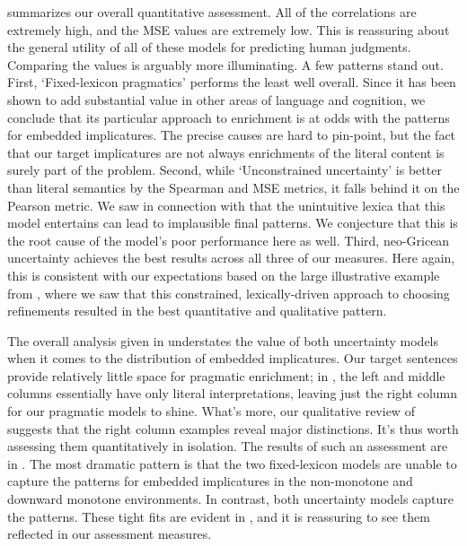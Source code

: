 \documentclass[leqno,12pt]{article}
\begin{document}
 summarizes our overall quantitative
assessment. All of the correlations are extremely high, and the MSE
values are extremely low. This is reassuring about the general utility
of all of these models for predicting human judgments. Comparing the
values is arguably more illuminating. A few patterns stand out.
First, `Fixed-lexicon pragmatics' performs the least well overall.
Since it has been shown to add substantial value in other areas of
language and cognition, we conclude that its particular approach to
enrichment is at odds with the patterns for embedded implicatures.
The precise causes are hard to pin-point, but the fact that our target
implicatures are not always enrichments of the literal content is
surely part of the problem.  Second, while `Unconstrained uncertainty'
is better than literal semantics by the Spearman and MSE metrics, it
falls behind it on the Pearson metric. We saw in connection with
 that the unintuitive lexica that this model
entertains can lead to implausible final patterns. We conjecture that
this is the root cause of the model's poor performance here as well.
Third, neo-Gricean uncertainty achieves the best results across all
three of our measures. Here again, this is consistent with our
expectations based on the large illustrative example from
, where we saw that this constrained,
lexically-driven approach to choosing refinements resulted in the best
quantitative and qualitative pattern.

The overall analysis given in  understates the
value of both uncertainty models when it comes to the distribution of
embedded implicatures. Our target sentences provide relatively little
space for pragmatic enrichment; in , the left
and middle columns essentially have only literal interpretations,
leaving just the right column for our pragmatic models to
shine. What's more, our qualitative review of
 suggests that the right column examples
reveal major distinctions. It's thus worth assessing them
quantitatively in isolation. The results of such an assessment are in
.  The most dramatic pattern is that the two
fixed-lexicon models are unable to capture the patterns for embedded
implicatures in the non-monotone and downward monotone
environments. In contrast, both uncertainty models capture the
patterns. These tight fits are evident in ,
and it is reassuring to see them reflected in our assessment measures.
\end{document}
